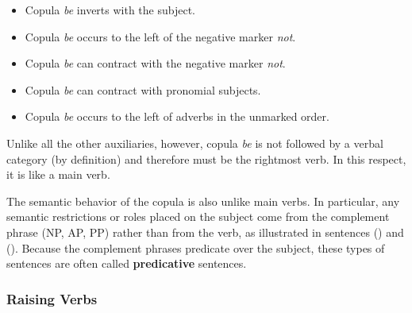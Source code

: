 \begin{itemize}
\item Copula {\it be} inverts with the subject.

\item Copula {\it be} occurs to the left of the negative marker {\it
not}.

\item Copula {\it be} can contract with the negative marker {\it not}.

\item Copula {\it be} can contract with pronomial subjects.

\item Copula {\it be} occurs to the left of adverbs in the unmarked order.
\end{itemize}

Unlike all the other auxiliaries, however, copula {\it be} is not followed by
a verbal category (by definition) and therefore must be the rightmost verb.  In
this respect, it is like a main verb.

The semantic behavior of the copula is also unlike main verbs.  In particular,
any semantic restrictions or roles placed on the subject come from the
complement phrase (NP, AP, PP) rather than from the verb, as illustrated in
sentences ({}) and ({}).  Because the complement phrases predicate over
the subject, these types of sentences are often called {\bf predicative}
sentences.



\subsubsection{Raising Verbs}
\label{raising-verbs}

